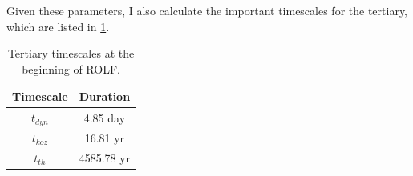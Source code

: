 Given these parameters, I also calculate the important timescales for the tertiary, which are listed in \cref{tab:tertiary_timescale_ROLF}.

\begin{table}[H]
    \centering
    \begin{tabular}{| c | c |}
       Timescale & Duration \\
       \hline
       $t_{dyn}$ & 4.85 day\\
       $t_{koz}$ & 16.81 yr\\
       $t_{th}$ & 4585.78 yr 
    \end{tabular}
    \caption{ Tertiary timescales at the beginning of ROLF.}
    \label{tab:tertiary_timescale_ROLF}
\end{table}




